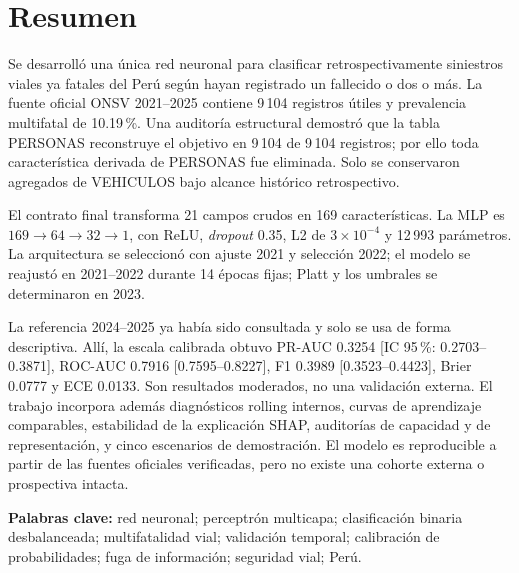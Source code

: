 \section*{Resumen}

Se desarrolló una única red neuronal para clasificar retrospectivamente siniestros viales ya fatales del Perú según hayan registrado un fallecido o dos o más. La fuente oficial ONSV 2021--2025 contiene 9\,104 registros útiles y prevalencia multifatal de 10.19\,\%. Una auditoría estructural demostró que la tabla PERSONAS reconstruye el objetivo en 9\,104 de 9\,104 registros; por ello toda característica derivada de PERSONAS fue eliminada. Solo se conservaron agregados de VEHICULOS bajo alcance histórico retrospectivo.

El contrato final transforma 21 campos crudos en 169 características. La MLP es $169\rightarrow64\rightarrow32\rightarrow1$, con ReLU, \emph{dropout} 0.35, L2 de $3\times10^{-4}$ y 12\,993 parámetros. La arquitectura se seleccionó con ajuste 2021 y selección 2022; el modelo se reajustó en 2021--2022 durante 14 épocas fijas; Platt y los umbrales se determinaron en 2023.

La referencia 2024--2025 ya había sido consultada y solo se usa de forma descriptiva. Allí, la escala calibrada obtuvo PR-AUC 0.3254 [IC 95\,\%: 0.2703--0.3871], ROC-AUC 0.7916 [0.7595--0.8227], F1 0.3989 [0.3523--0.4423], Brier 0.0777 y ECE 0.0133. Son resultados moderados, no una validación externa. El trabajo incorpora además diagnósticos rolling internos, curvas de aprendizaje comparables, estabilidad de la explicación SHAP, auditorías de capacidad y de representación, y cinco escenarios de demostración. El modelo es reproducible a partir de las fuentes oficiales verificadas, pero no existe una cohorte externa o prospectiva intacta.

\vspace{0.6em}
\noindent\textbf{Palabras clave:} red neuronal; perceptrón multicapa; clasificación binaria desbalanceada; multifatalidad vial; validación temporal; calibración de probabilidades; fuga de información; seguridad vial; Perú.
